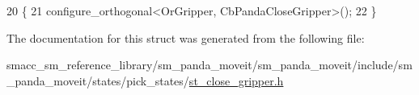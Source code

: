 \begin{DoxyCode}
20    \{
21       configure\_orthogonal<OrGripper, CbPandaCloseGripper>();
22    \}
\end{DoxyCode}


The documentation for this struct was generated from the following file\+:\begin{DoxyCompactItemize}
\item 
smacc\+\_\+sm\+\_\+reference\+\_\+library/sm\+\_\+panda\+\_\+moveit/sm\+\_\+panda\+\_\+moveit/include/sm\+\_\+panda\+\_\+moveit/states/pick\+\_\+states/\hyperlink{sm__panda__moveit_2sm__panda__moveit_2include_2sm__panda__moveit_2states_2pick__states_2st__close__gripper_8h}{st\+\_\+close\+\_\+gripper.\+h}\end{DoxyCompactItemize}
